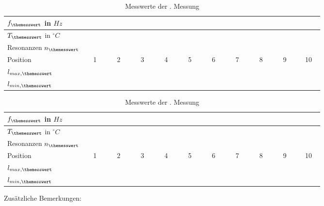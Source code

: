 \begin{table}[h!]
	\caption{Messwerte der {\themesswert}. Messung}
	\label{tab:messprotokoll->messung_3}
	\centering
	\begin{tabular}{|l|c|c|c|c|c|c|c|c|c|c|}
	\hline 
	$f_{\themesswert}$ in $Hz$ & \multicolumn{10}{c|}{~} \\ 
	\hline 
	$T_{\themesswert}$ in $^{\circ}C$ & \multicolumn{10}{c|}{~} \\ 
	\hline 
	Resonanzen $n_{\themesswert}$& \multicolumn{10}{c|}{~} \\ 
	\hline \rowcolor{secondcsvrow}
	Position & 1 & 2 & 3 & 4 & 5 & 6 & 7 & 8 & 9 & 10 \\ 
	\hline 
	$l_{max,{\themesswert}}$ & ~~~~~ & ~~~~~ & ~~~~~ & ~~~~~ & ~~~~~ & ~~~~~ & ~~~~~ & ~~~~~ & ~~~~~ & ~~~~~ \\ 
	\hline 
	$l_{min,{\themesswert}}$ & ~~~~~ & ~~~~~ & ~~~~~ & ~~~~~ & ~~~~~ & ~~~~~ & ~~~~~ & ~~~~~ & ~~~~~ & ~~~~~ \\
	\hline 
	\end{tabular} 	
\end{table}

\begin{table}[h!]
	\caption{Messwerte der {\themesswert}. Messung}
	\label{tab:messprotokoll->messung_4} 
	\centering
	\begin{tabular}{|l|c|c|c|c|c|c|c|c|c|c|}
	\hline 
	$f_{\themesswert}$ in $Hz$ & \multicolumn{10}{c|}{~} \\ 
	\hline 
	$T_{\themesswert}$ in $^{\circ}C$ & \multicolumn{10}{c|}{~} \\ 
	\hline 
	Resonanzen $n_{\themesswert}$& \multicolumn{10}{c|}{~} \\ 
	\hline \rowcolor{secondcsvrow}
	Position & 1 & 2 & 3 & 4 & 5 & 6 & 7 & 8 & 9 & 10 \\ 
	\hline 
	$l_{max,{\themesswert}}$ & ~~~~~ & ~~~~~ & ~~~~~ & ~~~~~ & ~~~~~ & ~~~~~ & ~~~~~ & ~~~~~ & ~~~~~ & ~~~~~ \\ 
	\hline 
	$l_{min,{\themesswert}}$ & ~~~~~ & ~~~~~ & ~~~~~ & ~~~~~ & ~~~~~ & ~~~~~ & ~~~~~ & ~~~~~ & ~~~~~ & ~~~~~ \\
	\hline 
	\end{tabular} 	
\end{table}
Zusätzliche Bemerkungen:
